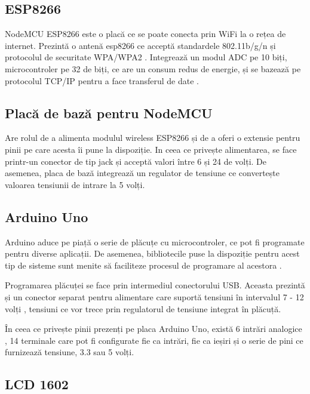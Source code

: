 \subsection{ESP8266}

	NodeMCU ESP8266 este o placă ce se poate conecta prin WiFi la o rețea de internet. Prezintă o antenă esp8266 ce acceptă standardele 802.11b/g/n și protocolul de securitate WPA/WPA2 \cite{esp8266}. Integrează un modul ADC pe 10 biți, microcontroler pe 32 de biți, ce are un consum redus de energie, și se bazează pe protocolul TCP/IP pentru a face transferul de date \cite{esp8266}.

\subsection{Placă de bază pentru NodeMCU}

	Are rolul de a alimenta modulul wireless ESP8266 și de a oferi o extensie pentru pinii pe care acesta îi pune la dispoziție. In ceea ce privește alimentarea, se face printr-un conector de tip jack și acceptă valori între 6 și 24 de volți. De asemenea, placa de bază integrează un regulator de tensiune ce convertește valoarea tensiunii de intrare la 5 volți.

\subsection{Arduino Uno}

	Arduino aduce pe piață o serie de plăcuțe cu microcontroler, ce pot fi programate pentru diverse aplicații. De asemenea, bibliotecile puse la dispoziție pentru acest tip de sisteme sunt menite să faciliteze procesul de programare al acestora \cite{arduino}.

	Programarea plăcuței se face prin intermediul conectorului USB. Aceasta prezintă și un conector separat pentru alimentare care suportă tensiuni în intervalul 7 - 12 volți \cite{arduino}, tensiuni ce vor trece prin regulatorul de tensiune integrat în plăcuță.

	În ceea ce privește pinii prezenți pe placa Arduino Uno, există 6 intrări analogice \cite{arduino}, 14 terminale care pot fi configurate fie ca intrări, fie ca ieșiri \cite{arduino} și o serie de pini ce furnizează tensiune, 3.3 sau 5 volți.

\subsection{LCD 1602}

